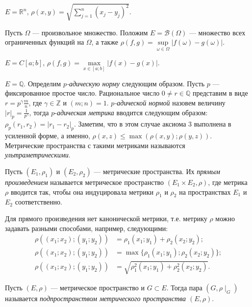 \documentclass[10pt]{article}
\begin{document}
\begin{ex}
   $E=\mathbb{R}^n$,
  $\rho(x,y)=\sqrt{\sum\limits_{j=1}^n(x_j-y_j)^2}$.
\end{ex}
\begin{ex}
   Пусть $\Omega$ --- произвольное множество. Положим
  $E=\mathcal{B}(\Omega)$ --- множество всех ограниченных функций на
  $\Omega$, а также
  $\rho(f,g)=\sup\limits_{\omega\in\Omega}|f(\omega)-g(\omega)|$.
\end{ex}
\begin{ex}
  $E=C[a;b]$, $\rho(f,g)=\max\limits_{x\in[a;b]}|f(x)-g(x)|$.
\end{ex}
\begin{ex}
   $E=\mathbb{Q}$. Определим \emph{$p$-адическую норму} следующим
  образом. Пусть $p$ --- фиксированное простое число. Рациональное
  число $0\neq r\in\mathbb{Q}$ представим в виде $r=p^\gamma\frac m
  n$, где $\gamma\in\mathbb{Z}$ и $(m;n)=1$. \emph{$p$-адической
    нормой} назовем величину $|r|_p=\frac{1}{p^\gamma}$, тогда
  $p$-\emph{адическая метрика} вводится следующим образом:
  $\rho_p(r_1,r_2)=|r_1-r_2|_p$. Заметим, что в этом случае аксиома 3
  выполнена в усиленной форме, а именно,
  $\rho(x,z)\leqslant\max(\rho(x,y);\rho(y,z))$. Метрические
  пространства с такими метриками называются
  \emph{ультраметрическими}.
\end{ex}
\begin{df}
Пусть $(E_1,\rho_1)$ и $(E_2,\rho_2)$ --- метрические пространства.
Их \emph{прямым произведением} называется метрическое пространство
$(E_1\times E_2,\rho)$, где метрика $\rho$ вводится так, чтобы она
индуцировала метрики $\rho_1$ и $\rho_2$ на пространствах $E_1$ и
$E_2$ соответственно.
\end{df}

\begin{note}
Для прямого произведения нет канонической метрики, т.е. метрику
$\rho$ можно задавать разными способами, например, следующими:
\begin{align*}
\rho((x_1;x_2);(y_1;y_2))&=\rho_1(x_1;y_1)+\rho_2(x_2;y_2);\\
\rho((x_1;x_2);(y_1;y_2))&=\max\{\rho_1(x_1;y_1);\rho_2(x_2;y_2)\};\\
\rho((x_1;x_2);(y_1;y_2))&=\sqrt{\rho_1^2(x_1;y_1)+\rho_2^2(x_2;y_2)}.
\end{align*}
\end{note}

\begin{df}
Пусть $(E,\rho)$ --- метрическое пространство и $G\subset E$. Тогда
пара $(G,\rho\mid_G)$ называется \emph{подпространством метрического
пространства $(E,\rho)$}.
\end{df}
\end{document}
